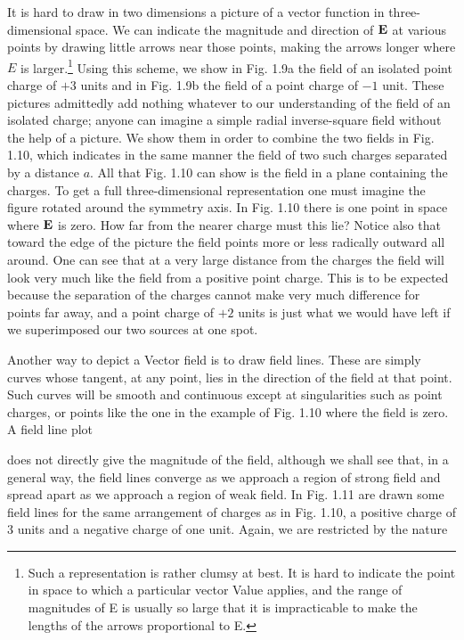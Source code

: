It is hard to draw in two dimensions a picture of a vector function
in three-dimensional space. We can indicate the magnitude and
direction of $\mathbf{E}$ at various points by drawing little arrows near those
points, making the arrows longer where $E$ is larger.\footnote{Such
a representation is rather clumsy at best. It is hard to indicate the point in
space to which a particular vector Value applies, and the range of magnitudes of E is
usually so large that it is impracticable to make the lengths of the arrows proportional
to E.
} Using this
scheme, we show in Fig. 1.9a the field of an isolated point charge of
$+3$ units and in Fig. 1.9b the field of a point charge of $-1$ unit.
These pictures admittedly add nothing whatever to our understanding
of the field of an isolated charge; anyone can imagine a simple
radial inverse-square field without the help of a picture. We show
them in order to combine the two fields in Fig. 1.10, which indicates
in the same manner the field of two such charges separated by a
distance $a$. All that Fig. 1.10 can show is the field in a plane containing
the charges. To get a full three-dimensional representation
one must imagine the figure rotated around the symmetry axis. In
Fig. 1.10 there is one point in space where $\mathbf{E}$ is zero. How far from
the nearer charge must this lie? Notice also that toward the edge of
the picture the field points more or less radically outward all around.
One can see that at a very large distance from the charges the field
will look very much like the field from a positive point charge. This
is to be expected because the separation of the charges cannot make
very much difference for points far away, and a point charge of $+2$
units is just what we would have left if we superimposed our two
sources at one spot.

Another way to depict a Vector field is to draw field lines. These
are simply curves whose tangent, at any point, lies in the direction of
the field at that point. Such curves will be smooth and continuous
except at singularities such as point charges, or points like the one
in the example of Fig. 1.10 where the field is zero. A field line plot

does not directly give the magnitude of the field, although we shall
see that, in a general way, the field lines converge as we approach a
region of strong field and spread apart as we approach a region of
weak field. In Fig. 1.11 are drawn some field lines for the same arrangement
of charges as in Fig. 1.10, a positive charge of 3 units and
a negative charge of one unit. Again, we are restricted by the nature


